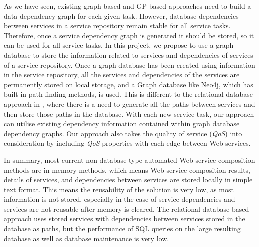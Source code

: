 As we have seen, existing graph-based \cite{5} and GP based \cite{2} approaches need to build a data dependency graph for each given task. However, database dependencies between services in a service repository remain stable for all service tasks. Therefore, once a service dependency graph is generated it should be stored, so it can be used for all service tasks. In this project, we propose to use a graph database to store the information related to services and dependencies of services of a service repository. Once a graph database has been created using information in the service repository, all the services and dependencies of the services are permanently stored on local storage, and a Graph database like Neo4j, which has built-in path-finding methods, is used. This is different to the relational-database approach in \cite{26}, where there is a need to generate all the paths between services and then store those paths in the database. With each new service task, our approach can utilise existing dependency information contained within graph database dependency graphs. Our approach also takes the quality of service (\emph{QoS}) into consideration by including \emph{QoS} properties with each edge between Web services.\par   
 
In summary, most current non-database-type automated Web service composition methods \cite{2,5} are in-memory methods, which means Web service composition results, details of services, and dependencies between services are stored locally in simple text format. This means the reusability of the solution is very low, as most information is not stored, especially in the case of service dependencies and services are not reusable after memory is cleared. The relational-database-based approach \cite{26} uses stored services with dependencies between services stored in the database as paths, but the performance of SQL queries on the large resulting database as well as database maintenance is very low.\par